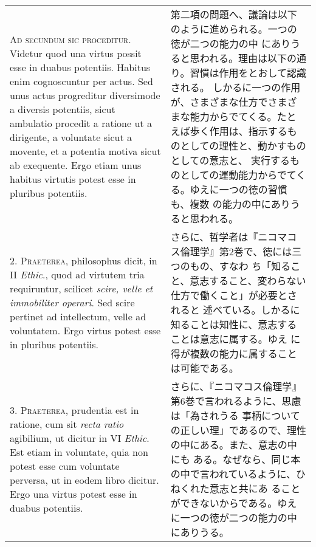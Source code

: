 \documentclass[10pt]{jsarticle}
\begin{document}
\begin{longtable}{p{21em}p{21em}}

{\scshape Ad secundum sic proceditur}. Videtur quod una virtus possit
esse in duabus potentiis. Habitus enim cognoscuntur per actus. Sed
unus actus progreditur diversimode a diversis potentiis, sicut
ambulatio procedit a ratione ut a dirigente, a voluntate sicut a
movente, et a potentia motiva sicut ab exequente. Ergo etiam unus
habitus virtutis potest esse in pluribus potentiis.

&

第二項の問題へ、議論は以下のように進められる。一つの徳が二つの能力の中
にありうると思われる。理由は以下の通り。習慣は作用をとおして認識される。
しかるに一つの作用が、さまざまな仕方でさまざまな能力からでてくる。たと
えば歩く作用は、指示するものとしての理性と、動かすものとしての意志と、
実行するものとしての運動能力からでてくる。ゆえに一つの徳の習慣も、複数
の能力の中にありうると思われる。

\\



2. {\scshape Praeterea}, philosophus dicit, in II {\itshape Ethic}.,
quod ad virtutem tria requiruntur, scilicet {\itshape scire, velle et
immobiliter operari}. Sed scire pertinet ad intellectum, velle ad
voluntatem. Ergo virtus potest esse in pluribus potentiis.

&

さらに、哲学者は『ニコマコス倫理学』第2巻で、徳には三つのもの、すなわ
ち「知ること、意志すること、変わらない仕方で働くこと」が必要とされると
述べている。しかるに知ることは知性に、意志することは意志に属する。ゆえ
に得が複数の能力に属することは可能である。

\\


3. {\scshape Praeterea}, prudentia est in ratione, cum sit {\itshape
recta ratio} agibilium, ut dicitur in VI {\itshape Ethic}. Est etiam
in voluntate, quia non potest esse cum voluntate perversa, ut in eodem
libro dicitur. Ergo una virtus potest esse in duabus potentiis.

&

さらに、『ニコマコス倫理学』第6巻で言われるように、思慮は「為されうる
事柄についての正しい理」であるので、理性の中にある。また、意志の中にも
ある。なぜなら、同じ本の中で言われているように、ひねくれた意志と共にあ
ることができないからである。ゆえに一つの徳が二つの能力の中にありうる。

\\


\end{longtable}
\end{document}
